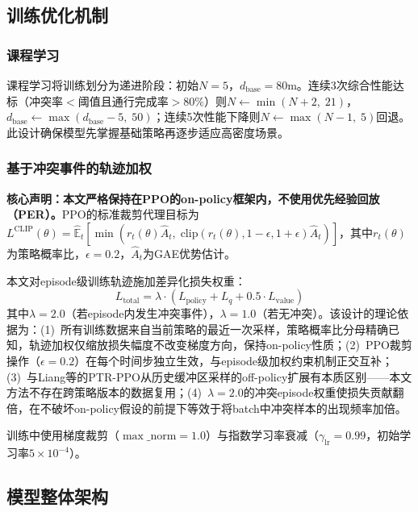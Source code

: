 \documentclass[12pt,a4paper,UTF8]{ctexart}
\begin{document}
\subsection{训练优化机制}

\subsubsection{课程学习}

课程学习将训练划分为递进阶段：初始$N=5$，$d_{\text{base}}=80\text{m}$。连续3次综合性能达标（冲突率$<$阈值且通行完成率$>80\%$）则$N \leftarrow \min(N+2,\; 21)$，$d_{\text{base}} \leftarrow \max(d_{\text{base}}-5,\; 50)$；连续5次性能下降则$N \leftarrow \max(N-1,\; 5)$回退。此设计确保模型先掌握基础策略再逐步适应高密度场景。

\subsubsection{基于冲突事件的轨迹加权}

\textbf{核心声明：本文严格保持在PPO的on-policy框架内，不使用优先经验回放（PER）。}PPO的标准裁剪代理目标为$L^{\text{CLIP}}(\theta) = \hat{\mathbb{E}}_t[\min(r_t(\theta)\hat{A}_t,\; \text{clip}(r_t(\theta), 1-\epsilon, 1+\epsilon)\hat{A}_t)]$，其中$r_t(\theta)$为策略概率比，$\epsilon = 0.2$，$\hat{A}_t$为GAE优势估计。

本文对episode级训练轨迹施加差异化损失权重：
\begin{equation}
    L_{\text{total}} = \lambda \cdot (L_{\text{policy}} + L_{q} + 0.5 \cdot L_{\text{value}})
\end{equation}
其中$\lambda = 2.0$（若episode内发生冲突事件），$\lambda = 1.0$（若无冲突）。该设计的理论依据为：(1)~所有训练数据来自当前策略的最近一次采样，策略概率比分母精确已知，轨迹加权仅缩放损失幅度不改变梯度方向，保持on-policy性质；(2)~PPO裁剪操作（$\epsilon=0.2$）在每个时间步独立生效，与episode级加权约束机制正交互补；(3)~与Liang等的PTR-PPO\cite{ref21}从历史缓冲区采样的off-policy扩展有本质区别——本文方法不存在跨策略版本的数据复用；(4)~$\lambda=2.0$的冲突episode权重使损失贡献翻倍，在不破坏on-policy假设的前提下等效于将batch中冲突样本的出现频率加倍。

训练中使用梯度裁剪（$\max\_\text{norm}=1.0$）与指数学习率衰减（$\gamma_{\text{lr}}=0.99$，初始学习率$5 \times 10^{-4}$）。

\subsection{模型整体架构}
\end{document}
